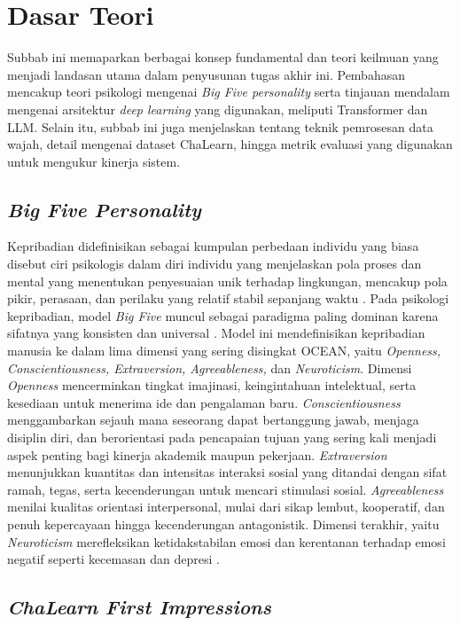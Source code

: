 \section{Dasar Teori}

Subbab ini memaparkan berbagai konsep fundamental dan teori keilmuan yang menjadi landasan utama dalam penyusunan tugas akhir ini. Pembahasan mencakup teori psikologi mengenai \textit{Big Five personality} serta tinjauan mendalam mengenai arsitektur \textit{deep learning} yang digunakan, meliputi Transformer dan LLM. Selain itu, subbab ini juga menjelaskan tentang teknik pemrosesan data wajah, detail mengenai dataset ChaLearn, hingga metrik evaluasi yang digunakan untuk mengukur kinerja sistem.

\subsection{\textit{Big Five Personality}}

Kepribadian didefinisikan sebagai kumpulan perbedaan individu yang biasa disebut ciri psikologis dalam diri individu yang menjelaskan pola proses dan mental yang menentukan penyesuaian unik terhadap lingkungan, mencakup pola pikir, perasaan, dan perilaku yang relatif stabil sepanjang waktu \parencite{Phan2021}. Pada psikologi kepribadian, model \textit{Big Five} muncul sebagai paradigma paling dominan karena sifatnya yang konsisten dan universal \parencite{Ponce-Lpez2016}. Model ini mendefinisikan kepribadian manusia ke dalam lima dimensi yang sering disingkat OCEAN, yaitu \textit{Openness, Conscientiousness, Extraversion, Agreeableness,} dan \textit{Neuroticism}. Dimensi \textit{Openness} mencerminkan tingkat imajinasi, keingintahuan intelektual, serta kesediaan untuk menerima ide dan pengalaman baru. \textit{Conscientiousness} menggambarkan sejauh mana seseorang dapat bertanggung jawab, menjaga disiplin diri, dan berorientasi pada pencapaian tujuan yang sering kali menjadi aspek penting bagi kinerja akademik maupun pekerjaan. \textit{Extraversion} menunjukkan kuantitas dan intensitas interaksi sosial yang ditandai dengan sifat ramah, tegas, serta kecenderungan untuk mencari stimulasi sosial. \textit{Agreeableness} menilai kualitas orientasi interpersonal, mulai dari sikap lembut, kooperatif, dan penuh kepercayaan hingga kecenderungan antagonistik. Dimensi terakhir, yaitu \textit{Neuroticism} merefleksikan ketidakstabilan emosi dan kerentanan terhadap emosi negatif seperti kecemasan dan depresi \parencite{Zell2022}.

\subsection{\textit{ChaLearn First Impressions}}

